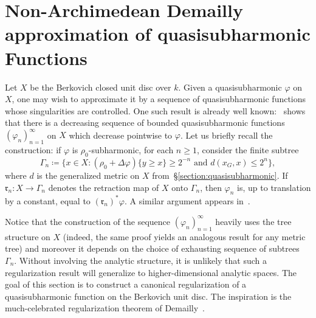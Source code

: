 \documentclass[10pt,reqno]{amsart}
\theoremstyle{plain}
\theoremstyle{definition}
\numberwithin{equation}{section}
\begin{document}
\section{Non-Archimedean Demailly approximation of quasisubharmonic Functions}\label{section:application}

Let $X$ be the Berkovich closed unit disc over $k$. Given a quasisubharmonic $\varphi$ on $X$, one may wish to approximate it by a sequence of quasisubharmonic functions whose singularities are controlled. One such result is already well known:~\cite[Theorem 2.10]{dynberko} shows that there is a decreasing sequence of bounded quasisubharmonic functions $(\varphi_n)_{n=1}^{\infty}$ on $X$ which decrease pointwise to $\varphi$. Let us briefly recall the construction: if $\varphi$ is $\rho_0$-subharmonic, for each $n \geq 1$, consider the finite subtree
$$
\Gamma_n \coloneqq \bigg\{ x \in X \colon (\rho_0 +\Delta \varphi) \{  y \geq x \} \geq 2^{-n} \textrm{ and } d(x_G,x) \leq 2^n \bigg\},
$$
where $d$ is the generalized metric on $X$ from~\S\ref{section:quasisubharmonic}. If $\mathfrak{r}_n \colon X \to \Gamma_n$ denotes the retraction map of $X$ onto $\Gamma_n$, then $\varphi_n$ is, up to translation by a constant, equal to $(\mathfrak{r}_n)^*\varphi$. A similar argument appears in~\cite[\S4.6]{favre06}.

Notice that the construction of the sequence $(\varphi_n)_{n=1}^{\infty}$ heavily uses the tree structure on $X$ (indeed, the same proof yields an analogous result for any metric tree) and moreover it depends on the choice of exhausting sequence of subtrees $\Gamma_n$. Without involving the analytic structure, it is unlikely that such a regularization result will generalize to higher-dimensional analytic spaces. The goal of this section is to construct a canonical regularization of a quasisubharmonic function on the Berkovich unit disc. The inspiration is the much-celebrated regularization theorem of Demailly~\cite[Proposition 3.1]{demailly92}.
\end{document}
